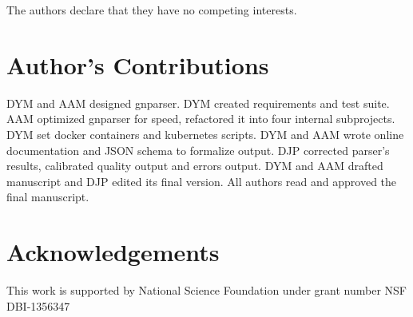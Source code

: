 \documentclass{bmcart}
\begin{document}
The authors declare that they have no competing interests.

\section*{Author's Contributions}

DYM and AAM designed gnparser. DYM created requirements and test suite. AAM
optimized gnparser for speed, refactored it into four internal subprojects.
DYM set docker containers and kubernetes scripts. DYM and AAM wrote online
documentation and JSON schema to formalize output. DJP corrected parser's
results, calibrated quality output and errors output. DYM and AAM drafted
manuscript and DJP edited its final version. All authors read and approved the
final manuscript.

\section*{Acknowledgements}

This work is supported by National Science Foundation under grant number NSF
DBI-1356347


\end{document}
